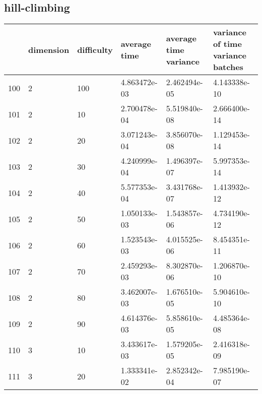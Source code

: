 \documentclass{article}
\begin{document}
\subsection{hill-climbing}
\begin{center}
\begin{tabular}{llllll}
\toprule
{} & dimension & difficulty &  average time & average time variance & variance of time variance batches \\
\midrule
100 &         2 &        100 &  4.863472e-03 &          2.462494e-05 &                      4.143338e-10 \\
101 &         2 &         10 &  2.700478e-04 &          5.519840e-08 &                      2.666400e-14 \\
102 &         2 &         20 &  3.071243e-04 &          3.856070e-08 &                      1.129453e-14 \\
103 &         2 &         30 &  4.240999e-04 &          1.496397e-07 &                      5.997353e-14 \\
104 &         2 &         40 &  5.577353e-04 &          3.431768e-07 &                      1.413932e-12 \\
105 &         2 &         50 &  1.050133e-03 &          1.543857e-06 &                      4.734190e-12 \\
106 &         2 &         60 &  1.523543e-03 &          4.015525e-06 &                      8.454351e-11 \\
107 &         2 &         70 &  2.459293e-03 &          8.302870e-06 &                      1.206870e-10 \\
108 &         2 &         80 &  3.462007e-03 &          1.676510e-05 &                      5.904610e-10 \\
109 &         2 &         90 &  4.614376e-03 &          5.858610e-05 &                      4.485364e-08 \\
110 &         3 &         10 &  3.433617e-03 &          1.579205e-05 &                      2.416318e-09 \\
111 &         3 &         20 &  1.333341e-02 &          2.852342e-04 &                      7.985190e-07 \\
\bottomrule
\end{tabular}
\end{center}
\end{document}
